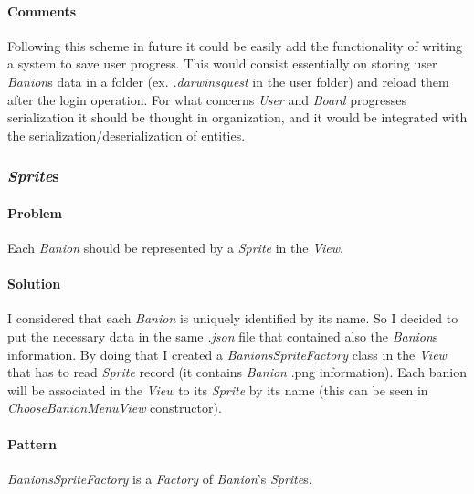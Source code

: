 \documentclass[12pt, a4paper]{report}
\begin{document}
            \paragraph{Comments}

            Following this scheme in future it could be easily add the functionality of writing a system to save user progress.
            This would consist essentially on storing user \emph{Banion}s data in a folder (ex. \emph{.darwinsquest} in the user folder) and reload them after the login operation.
            For what concerns \emph{User} and \emph{Board} progresses serialization it should be thought in organization, and it would be integrated with the serialization/deserialization of entities.

        \pagebreak

        \subsubsection{\emph{Sprite}s}

            \paragraph{Problem}

            Each \emph{Banion} should be represented by a \emph{Sprite} in the \emph{View}.

            \paragraph{Solution}

            I considered that each \emph{Banion} is uniquely identified by its name.
            So I decided to put the necessary data in the same \textit{.json} file that contained also the \emph{Banion}s information.
            By doing that I created a \emph{BanionsSpriteFactory} class in the \emph{View} that has to read \emph{Sprite} record (it contains \emph{Banion} .png information).
            Each banion will be associated in the \emph{View} to its \emph{Sprite} by its name (this can be seen in \emph{ChooseBanionMenuView} constructor).

            \paragraph{Pattern}

            \emph{BanionsSpriteFactory} is a \emph{Factory} of \emph{Banion}'s \emph{Sprite}s.
            
\end{document}
